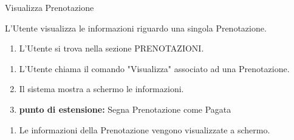 {\ucTable	%
	{	%
		Visualizza Prenotazione
		
	}{	%
		
	}{	%
        L'Utente visualizza le informazioni riguardo una singola Prenotazione.
		
	}{	%
		\attori
	}{	%
		\begin{enumerate}
            \item L'Utente si trova nella sezione PRENOTAZIONI.
		\end{enumerate}
		
	}{	%
		\begin{enumerate}
			\item L'Utente chiama il comando "Visualizza" associato ad una Prenotazione.
            \item Il sistema mostra a schermo le informazioni.
            \item[] \textbf{punto di estensione:} Segna Prenotazione come Pagata
		\end{enumerate}
		
	}{	%
		\begin{enumerate}
            \item Le informazioni della Prenotazione vengono visualizzate a schermo.
		\end{enumerate}
		
	}{	%
} }


